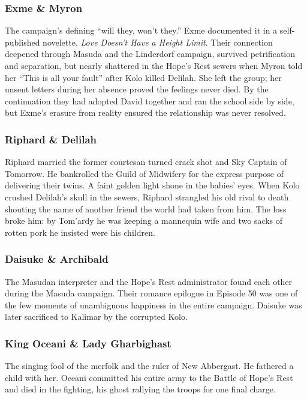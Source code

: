 \subsubsection*{Exme \& Myron}

The campaign's defining ``will they, won't they.''  Exme documented it in a self-published novelette, \textit{Love Doesn't Have a Height Limit}.  Their connection deepened through Masuda and the Linderdorf campaign, survived petrification and separation, but nearly shattered in the Hope's Rest sewers when Myron told her ``This is all your fault'' after Kolo killed Delilah.  She left the group; her unsent letters during her absence proved the feelings never died.  By the continuation they had adopted David together and ran the school side by side, but Exme's erasure from reality ensured the relationship was never resolved.

\subsubsection*{Riphard \& Delilah}

Riphard married the former courtesan turned crack shot and Sky Captain of Tomorrow.  He bankrolled the Guild of Midwifery for the express purpose of delivering their twins.  A faint golden light shone in the babies' eyes.  When Kolo crushed Delilah's skull in the sewers, Riphard strangled his old rival to death shouting the name of another friend the world had taken from him.  The loss broke him: by Tom'ardy he was keeping a mannequin wife and two sacks of rotten pork he insisted were his children.

\subsubsection*{Daisuke \& Archibald}

The Masudan interpreter and the Hope's Rest administrator found each other during the Masuda campaign.  Their romance epilogue in Episode 50 was one of the few moments of unambiguous happiness in the entire campaign.  Daisuke was later sacrificed to Kalimar by the corrupted Kolo.

\subsubsection*{King Oceani \& Lady Gharbighast}

The singing fool of the merfolk and the ruler of New Abbergast.  He fathered a child with her.  Oceani committed his entire army to the Battle of Hope's Rest and died in the fighting, his ghost rallying the troops for one final charge.

